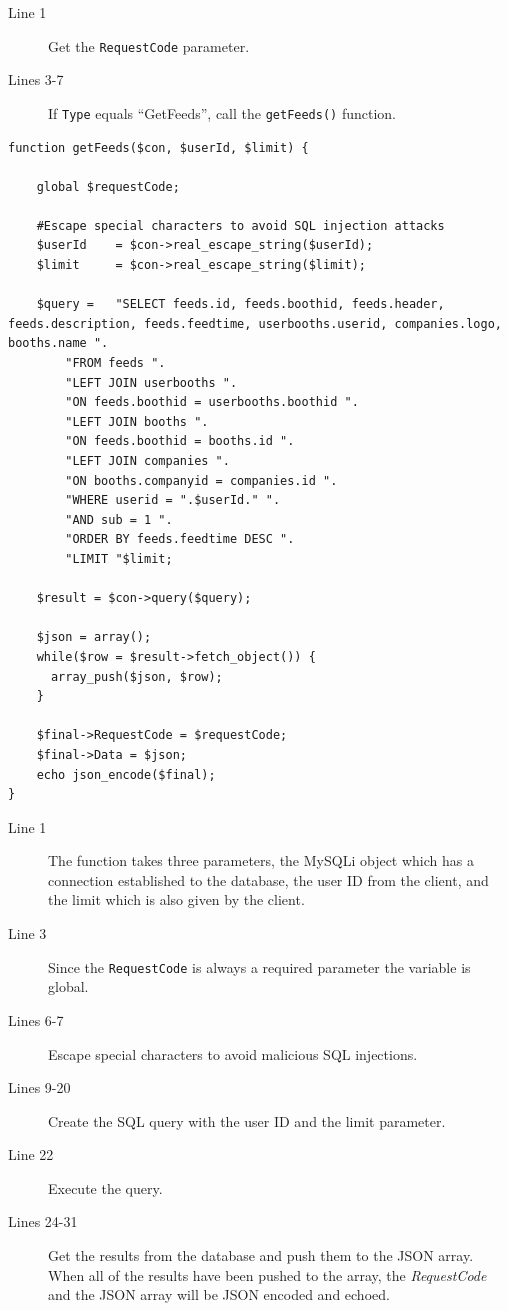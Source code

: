\begin{description}
\item[Line 1] Get the \lstinline|RequestCode| parameter.
\item[Lines 3-7] If \lstinline|Type| equals ``GetFeeds'', call the \lstinline|getFeeds()| function.
\end{description}


\begin{lstlisting}[language=phpstyle, label=lst:getFeeds, caption={getFeeds function}]
function getFeeds($con, $userId, $limit) {

    global $requestCode;

    #Escape special characters to avoid SQL injection attacks
    $userId    = $con->real_escape_string($userId);
    $limit     = $con->real_escape_string($limit);

    $query =   "SELECT feeds.id, feeds.boothid, feeds.header, feeds.description, feeds.feedtime, userbooths.userid, companies.logo, booths.name ".
        "FROM feeds ".
        "LEFT JOIN userbooths ".
        "ON feeds.boothid = userbooths.boothid ".
        "LEFT JOIN booths ".
        "ON feeds.boothid = booths.id ".
        "LEFT JOIN companies ".
        "ON booths.companyid = companies.id ".
        "WHERE userid = ".$userId." ".
        "AND sub = 1 ".
        "ORDER BY feeds.feedtime DESC ".
        "LIMIT "$limit;

    $result = $con->query($query);

    $json = array();
    while($row = $result->fetch_object()) {
      array_push($json, $row);
    }
    
    $final->RequestCode = $requestCode;
    $final->Data = $json;
    echo json_encode($final);
}
\end{lstlisting}

\begin{description}
\item[Line 1] The function takes three parameters, the MySQLi object which has a connection
  established to the database, the user ID from the client, and the limit which is also given by the client.
\item[Line 3] Since the \lstinline|RequestCode| is always a required parameter the variable is global.
\item[Lines 6-7] Escape special characters to avoid malicious SQL injections.
\item[Lines 9-20] Create the SQL query with the user ID and the limit parameter.
\item[Line 22] Execute the query.
\item[Lines 24-31] Get the results from the database and push them to the JSON array. When all of the results have been pushed to the array, the \textit{RequestCode} and the JSON array will be JSON encoded and echoed.
\end{description}

